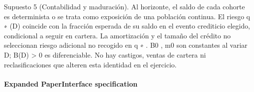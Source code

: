 \documentclass[10pt]{article}
\begin{document}
\begin{ReviewVerbatim}

Supuesto 5 (Contabilidad y maduración). Al horizonte, el saldo de cada cohorte es determinista
o se trata como exposición de una población continua. El riesgo q ∗ (D) coincide con la fracción
esperada de su saldo en el evento crediticio elegido, condicional a seguir en cartera. La amortización
y el tamaño del crédito no seleccionan riesgo adicional no recogido en q ∗ . B0 , m0 son constantes
al variar D; B(D) > 0 es diferenciable. No hay castigos, ventas de cartera ni reclasiﬁcaciones que
alteren esta identidad en el ejercicio.
\end{ReviewVerbatim}



\paragraph{Expanded PaperInterface specification}
\end{document}
